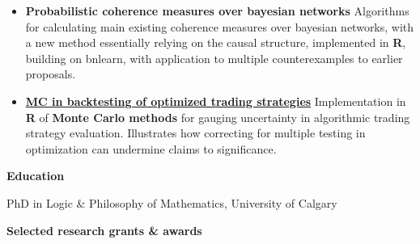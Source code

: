 \documentclass[10pt, a4paper]{article}
\newcommand{\years}[1]{\marginnote{\normalsize #1}}
\begin{document}
\begin{itemize} [leftmargin=*]
\vspace{-1mm}

\normalsize 
\item 	%
\textbf{Probabilistic coherence measures over bayesian networks}%
\newline  \scriptsize Algorithms for calculating  main existing coherence measures over bayesian networks, with a new method essentially relying on the causal structure,  implemented in \textbf{\textsf{R}}, building on \textsf{bnlearn}, with application to multiple counterexamples to earlier proposals.







\vspace{-1mm}

\normalsize 
\item 	\href{https://rfl-urbaniak.github.io/backtesting/}{
	\textbf{MC in backtesting of optimized trading strategies}} 
\newline  \scriptsize  Implementation in \textbf{\textsf{R}} of \textbf{Monte Carlo methods} for gauging uncertainty in algorithmic trading strategy evaluation. Illustrates how correcting for multiple testing in optimization can undermine claims to significance.





\end{itemize}




\textbf{{\sc \Large Education}}\\


\vspace{-5mm}

\years{2008} PhD in Logic \& Philosophy of Mathematics, University of Calgary


\vspace{1mm}

\textbf{{\sc \Large Selected research grants \& awards}}\\
\end{document}
